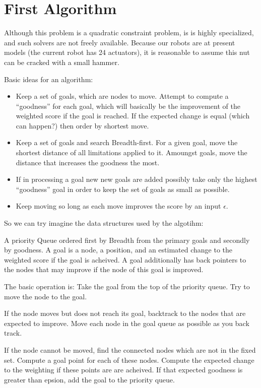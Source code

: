 \documentclass[11pt]{article}
\begin{document}
\section{First Algorithm}

Although this problem is a quadratic constraint problem,
is is highly specialized, and such solvers are not
freely available. Because our robots are at present models
(the current robot has 24 actuators), it is
reasonable to assume this nut can be cracked with a small hammer.

Basic ideas for an algorithm:
\begin{itemize}
\item Keep a set of goals, which are nodes to move.  Attempt to compute a ``goodness''
  for each goal,
  which will basically be the improvement of the weighted score if the goal is reached. If the
  expected change is equal (which can happen?) then order by shortest move.
\item Keep a set of goals and search Breadth-first. For a given goal, move the shortest distance
  of all limitations applied to it.  Amoungst goals, move the distance that increases the goodness
  the most.
\item If in processing a goal new new goals are added possibly
  take only the highest ``goodness'' goal in order
  to keep the set of goals as small as possible.
  \item Keep moving so long as each move improves the score by an input $\epsilon$.
\end{itemize}

So we can try imagine the data structures used by the algotihm:

A priority Queue ordered first by Breadth from the primary goals and secondly by goodness.
A goal is a node, a position, and an estimated change to the weighted score
if the goal is acheived.
A goal additionally has back pointers to the nodes that may improve
if the node of this goal is improved.

The basic operation is:
Take the goal from the top of the priority queue.
Try to move the node to the goal.

If the node moves but does not reach its goal, backtrack to the nodes that are expected
to improve. Move each node in the goal queue as possible as you back track.

If the node cannot be moved, find the connected nodes
which are not in the fixed set. Compute a goal point for each of these nodes. Compute the
expected change to the weighting if these points are are acheived. If that expected
goodness is greater than epsion, add the goal to the
priority queue.
\end{document}
